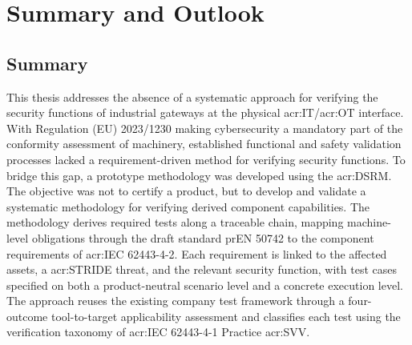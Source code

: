 \chapter{Summary and Outlook} 
\label{chap:summary_outlook}

\section{Summary} 
\label{sec:summary_findings} 

This thesis addresses the absence of a systematic approach for verifying the security functions of industrial gateways at the physical \gls{acr:IT}/\gls{acr:OT} interface. With Regulation (EU) 2023/1230 making cybersecurity a mandatory part of the conformity assessment of machinery, established functional and safety validation processes lacked a requirement-driven method for verifying security functions. To bridge this gap, a prototype methodology was developed using the \acrfull{acr:DSRM}. The objective was not to certify a product, but to develop and validate a systematic methodology for verifying derived component capabilities. The methodology derives required tests along a traceable chain, mapping machine-level obligations through the draft standard prEN 50742 to the component requirements of \gls{acr:IEC} 62443-4-2. Each requirement is linked to the affected assets, a \gls{acr:STRIDE} threat, and the relevant security function, with test cases specified on both a product-neutral scenario level and a concrete execution level. The approach reuses the existing company test framework through a four-outcome tool-to-target applicability assessment and classifies each test using the verification taxonomy of \gls{acr:IEC} 62443-4-1 Practice \gls{acr:SVV}.

